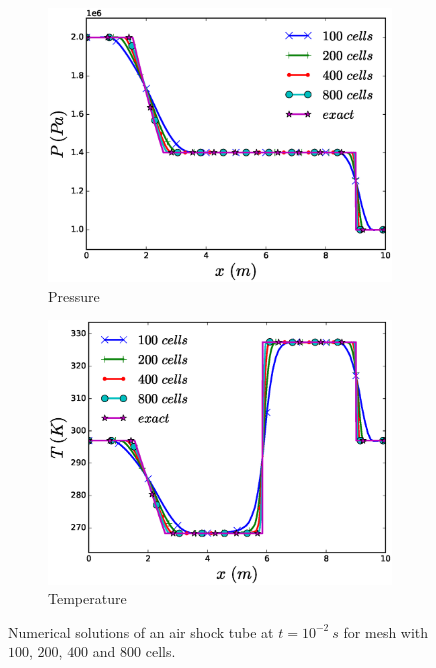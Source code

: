 \documentclass{inputs/mc2015}
\begin{document}
\begin{figure}[H]
        \begin{subfigure}[b]{0.495\textwidth}
                \centering
                \includegraphics[width=\textwidth]{figures/air-shock-tube-pressure-plot.eps}
                \caption{Pressure}
                \label{fig:air-tube-plots-press}
        \end{subfigure}        
        \begin{subfigure}[b]{0.495\textwidth}
                \centering
                \includegraphics[width=\textwidth]{figures/air-shock-tube-temperature-plot.eps}
                \caption{Temperature}
                \label{fig:air-tube-plots-temp}
        \end{subfigure}
        \caption{Numerical solutions of an air shock tube at $t=10^{-2} \ s$ for mesh with $100$, $200$, $400$ and $800$ cells.}\label{fig:air-tube-plots}
\end{figure}
\end{document}
